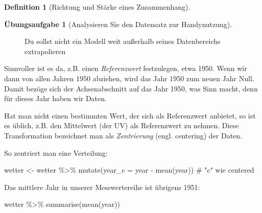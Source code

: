 \documentclass[
  a4paper,
  DIV=11]{scrreprt}
\newenvironment{Shaded}{\begin{snugshade}}{\end{snugshade}}
\newcommand{\AttributeTok}[1]{\textcolor[rgb]{0.40,0.45,0.13}{#1}}
\newcommand{\CommentTok}[1]{\textcolor[rgb]{0.37,0.37,0.37}{#1}}
\newcommand{\FunctionTok}[1]{\textcolor[rgb]{0.28,0.35,0.67}{#1}}
\newcommand{\NormalTok}[1]{\textcolor[rgb]{0.00,0.23,0.31}{#1}}
\newcommand{\OtherTok}[1]{\textcolor[rgb]{0.00,0.23,0.31}{#1}}
\newcommand{\SpecialCharTok}[1]{\textcolor[rgb]{0.37,0.37,0.37}{#1}}
\theoremstyle{definition}
\newtheorem{exercise}{Übungsaufgabe}[chapter]
\theoremstyle{definition}
\theoremstyle{definition}
\newtheorem{definition}{Definition}[chapter]
\theoremstyle{remark}
\begin{document}
\begin{definition}[Richtung und Stärke eines
Zusammenhang]
\begin{exercise}[Analysieren Sie den Datensatz zur
Handynutzung]
\begin{figure}


\caption{\label{fig-extrapolation}Du sollst nicht ein Modell weit
außerhalb seines Datenbereichs extrapolieren}

\end{figure}%

Sinnvoller ist es da, z.B. einen \emph{Referenzwert} festzulegen, etwa
1950. Wenn wir dann von allen Jahren 1950 abziehen, wird das Jahr 1950
zum neuen Jahr Null. Damit bezöge sich der Achsenabschnitt auf das Jahr
1950, was Sinn macht, denn für dieses Jahr haben wir Daten.

Hat man nicht einen bestimmten Wert, der sich als Referenzwert anbietet,
so ist es üblich, z.B. den Mittelwert (der UV) als Referenzwert zu
nehmen. Diese Transformation bezeichnet man als \emph{Zentrierung}
(engl. centering) der Daten.

So zentriert man eine Verteilung:

\begin{Shaded}
\begin{Highlighting}[]
\NormalTok{wetter }\OtherTok{\textless{}{-}}
\NormalTok{  wetter }\SpecialCharTok{\%\textgreater{}\%} 
  \FunctionTok{mutate}\NormalTok{(}\AttributeTok{year\_c =}\NormalTok{ year }\SpecialCharTok{{-}} \FunctionTok{mean}\NormalTok{(year))  }\CommentTok{\# "c" wie centered}
\end{Highlighting}
\end{Shaded}

Das mittlere Jahr in unserer Messwertereihe ist übrigens 1951:

\begin{Shaded}
\begin{Highlighting}[]
\NormalTok{wetter }\SpecialCharTok{\%\textgreater{}\%} 
  \FunctionTok{summarise}\NormalTok{(}\FunctionTok{mean}\NormalTok{(year))}
\end{Highlighting}
\end{Shaded}


\end{exercise}
\end{definition}
\end{document}
